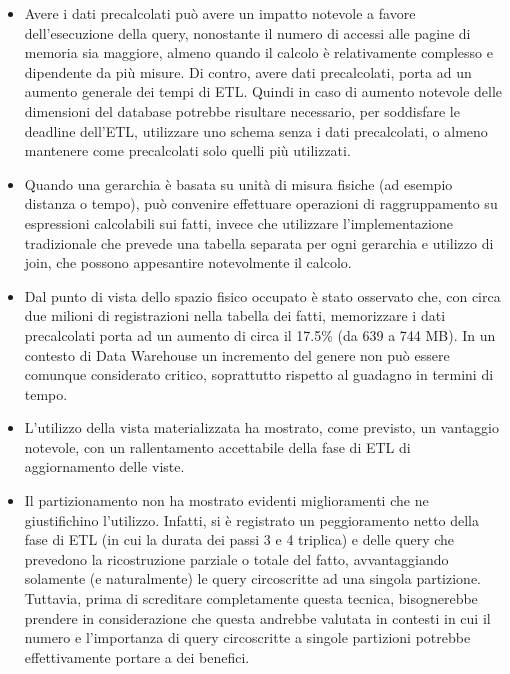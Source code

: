 \begin{itemize}
	\item Avere i dati precalcolati può avere un impatto notevole a favore dell’esecuzione della query, nonostante il numero di accessi alle pagine di memoria sia maggiore, almeno quando il calcolo è relativamente complesso e dipendente da più misure.
	Di contro, avere dati precalcolati, porta ad un aumento generale dei tempi di ETL.
	Quindi in caso di aumento notevole delle dimensioni del database potrebbe
	risultare necessario, per soddisfare le deadline dell’ETL, utilizzare uno schema
	senza i dati precalcolati, o almeno mantenere come precalcolati solo quelli più
	utilizzati.
	\item Quando una gerarchia è basata su unità di misura fisiche (ad esempio distanza o
	tempo), può convenire effettuare operazioni di raggruppamento su espressioni
	calcolabili sui fatti, invece che utilizzare l’implementazione tradizionale che
	prevede una tabella separata per ogni gerarchia e utilizzo di join, che possono
	appesantire notevolmente il calcolo.
	\item Dal punto di vista dello spazio fisico occupato è stato osservato che, con circa due
	milioni di registrazioni nella tabella dei fatti, memorizzare i dati precalcolati porta
	ad un aumento di circa il 17.5\% (da 639 a 744 MB). In un contesto di Data
	Warehouse un incremento del genere non può essere comunque considerato
	critico, soprattutto rispetto al guadagno in termini di tempo.
	\item L’utilizzo della vista materializzata ha mostrato, come previsto, un vantaggio
	notevole, con un rallentamento accettabile della fase di ETL di aggiornamento
	delle viste.
	\item Il partizionamento non ha mostrato evidenti miglioramenti che ne giustifichino
	l’utilizzo. Infatti, si è registrato un peggioramento netto della fase di ETL (in cui la
	durata dei passi 3 e 4 triplica) e delle query che prevedono la ricostruzione parziale
	o totale del fatto, avvantaggiando solamente (e naturalmente) le query circoscritte
	ad una singola partizione. Tuttavia, prima di screditare completamente questa
	tecnica, bisognerebbe prendere in considerazione che questa andrebbe valutata
	in contesti in cui il numero e l’importanza di query circoscritte a singole partizioni
	potrebbe effettivamente portare a dei benefici.
\end{itemize}